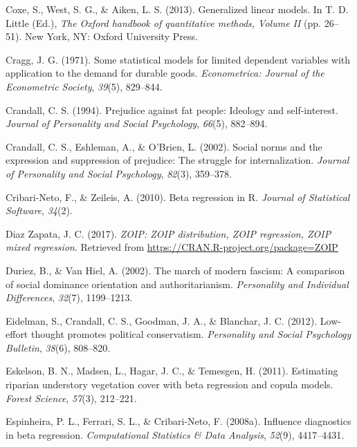 \documentclass[english,man]{apa6}
\newcounter{author}
\theoremstyle{definition}
\theoremstyle{definition}
\theoremstyle{remark}
\begin{document}
\hypertarget{ref-coxe2013generalized}{}
Coxe, S., West, S. G., \& Aiken, L. S. (2013). Generalized linear
models. In T. D. Little (Ed.), \emph{The Oxford handbook of quantitative
methods, Volume II} (pp. 26--51). New York, NY: Oxford University Press.

\hypertarget{ref-cragg1971some}{}
Cragg, J. G. (1971). Some statistical models for limited dependent
variables with application to the demand for durable goods.
\emph{Econometrica: Journal of the Econometric Society}, \emph{39}(5),
829--844.

\hypertarget{ref-crandall1994prejudice}{}
Crandall, C. S. (1994). Prejudice against fat people: Ideology and
self-interest. \emph{Journal of Personality and Social Psychology},
\emph{66}(5), 882--894.

\hypertarget{ref-crandall2002social}{}
Crandall, C. S., Eshleman, A., \& O'Brien, L. (2002). Social norms and
the expression and suppression of prejudice: The struggle for
internalization. \emph{Journal of Personality and Social Psychology},
\emph{82}(3), 359--378.

\hypertarget{ref-cribarineto2010beta}{}
Cribari-Neto, F., \& Zeileis, A. (2010). Beta regression in R.
\emph{Journal of Statistical Software}, \emph{34}(2).

\hypertarget{ref-zoip2017}{}
Diaz Zapata, J. C. (2017). \emph{ZOIP: ZOIP distribution, ZOIP
regression, ZOIP mixed regression}. Retrieved from
\url{https://CRAN.R-project.org/package=ZOIP}

\hypertarget{ref-duriez2002march}{}
Duriez, B., \& Van Hiel, A. (2002). The march of modern fascism: A
comparison of social dominance orientation and authoritarianism.
\emph{Personality and Individual Differences}, \emph{32}(7), 1199--1213.

\hypertarget{ref-eidelman2012low}{}
Eidelman, S., Crandall, C. S., Goodman, J. A., \& Blanchar, J. C.
(2012). Low-effort thought promotes political conservatism.
\emph{Personality and Social Psychology Bulletin}, \emph{38}(6),
808--820.

\hypertarget{ref-eskelson2011estimating}{}
Eskelson, B. N., Madsen, L., Hagar, J. C., \& Temesgen, H. (2011).
Estimating riparian understory vegetation cover with beta regression and
copula models. \emph{Forest Science}, \emph{57}(3), 212--221.

\hypertarget{ref-espinheira2008influence}{}
Espinheira, P. L., Ferrari, S. L., \& Cribari-Neto, F. (2008a).
Influence diagnostics in beta regression. \emph{Computational Statistics
\& Data Analysis}, \emph{52}(9), 4417--4431.
\end{document}

